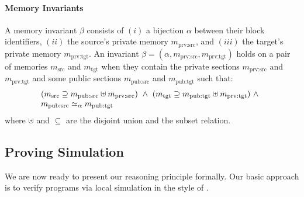 \paragraph{Memory Invariants}
A memory invariant $\beta$ consists of $(i)$ a bijection $\alpha$ between their
block identifiers, $(ii)$ the source's private memory
$m_\textrm{prv:src}$, and $(iii)$ the target's private memory
$m_\textrm{prv:tgt}$. 
An invariant $\beta=(\alpha, m_\textrm{prv:src}, m_\textrm{prv:tgt})$ 
holds on a pair of memories $m_{\textrm{src}}$ and
$m_{\textrm{tgt}}$ when they contain the private sections $m_\textrm{prv:src}$ and 
$m_\textrm{prv:tgt}$
and some public sections $m_\textrm{pub:src}$ and
$m_\textrm{pub:tgt}$ such that:
  \[\begin{array}{@{}l}
    (m_{\textrm{src}} \supseteq m_\textrm{pub:src} \uplus m_\textrm{prv:src})~\land~
    (m_{\textrm{tgt}} \supseteq m_\textrm{pub:tgt} \uplus m_\textrm{prv:tgt})~\land\\m_{\textrm{pub:src}} \simeq_\alpha m_{\textrm{pub:tgt}}
  \end{array}\]
  where 
$\uplus$ and $\subseteq$ are the disjoint union and the subset relation.

\subsection{Proving Simulation}
\label{reasoning:simulation}

We are now ready to present our reasoning principle formally. Our
basic approach is to verify programs via local simulation in the style
of \cite{Hur:2012:MBK:2103656.2103666}.


